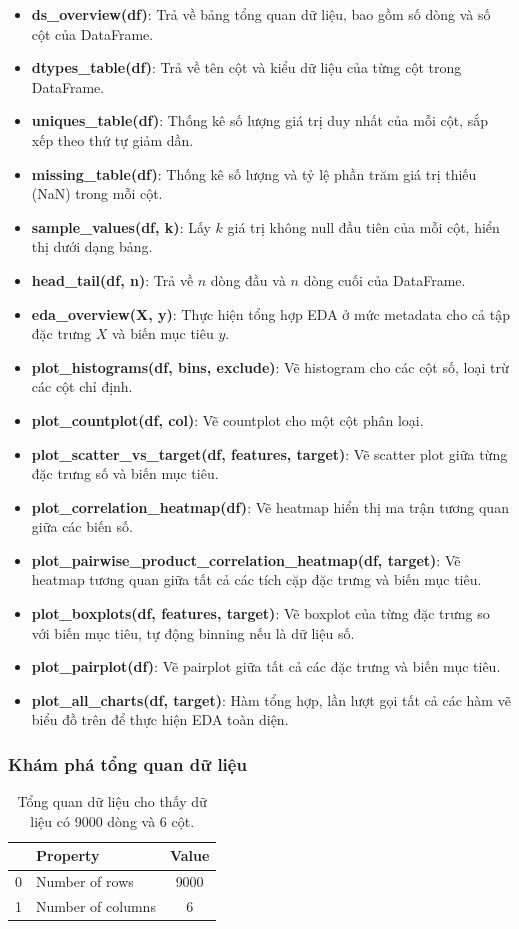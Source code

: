 \begin{itemize}
	\item \textbf{ds\_overview(df)}: Trả về bảng tổng quan dữ liệu, bao gồm số dòng và số cột của DataFrame.
	\item \textbf{dtypes\_table(df)}: Trả về tên cột và kiểu dữ liệu của từng cột trong DataFrame.
	\item \textbf{uniques\_table(df)}: Thống kê số lượng giá trị duy nhất của mỗi cột, sắp xếp theo thứ tự giảm dần.
	\item \textbf{missing\_table(df)}: Thống kê số lượng và tỷ lệ phần trăm giá trị thiếu (NaN) trong mỗi cột.
	\item \textbf{sample\_values(df, k)}: Lấy $k$ giá trị không null đầu tiên của mỗi cột, hiển thị dưới dạng bảng.
	\item \textbf{head\_tail(df, n)}: Trả về $n$ dòng đầu và $n$ dòng cuối của DataFrame.
	\item \textbf{eda\_overview(X, y)}: Thực hiện tổng hợp EDA ở mức metadata cho cả tập đặc trưng $X$ và biến mục tiêu $y$.
	\item \textbf{plot\_histograms(df, bins, exclude)}: Vẽ histogram cho các cột số, loại trừ các cột chỉ định.
	\item \textbf{plot\_countplot(df, col)}: Vẽ countplot cho một cột phân loại.
	\item \textbf{plot\_scatter\_vs\_target(df, features, target)}: Vẽ scatter plot giữa từng đặc trưng số và biến mục tiêu.
	\item \textbf{plot\_correlation\_heatmap(df)}: Vẽ heatmap hiển thị ma trận tương quan giữa các biến số.
	\item \textbf{plot\_pairwise\_product\_correlation\_heatmap(df, target)}: Vẽ heatmap tương quan giữa tất cả các tích cặp đặc trưng và biến mục tiêu.
	\item \textbf{plot\_boxplots(df, features, target)}: Vẽ boxplot của từng đặc trưng so với biến mục tiêu, tự động binning nếu là dữ liệu số.
	\item \textbf{plot\_pairplot(df)}: Vẽ pairplot giữa tất cả các đặc trưng và biến mục tiêu.
	\item \textbf{plot\_all\_charts(df, target)}: Hàm tổng hợp, lần lượt gọi tất cả các hàm vẽ biểu đồ trên để thực hiện EDA toàn diện.
\end{itemize}

\subsubsection{Khám phá tổng quan dữ liệu}
\begin{table}[H]
	\centering
	\begin{tabular}{|c|l|c|}
		\hline
		\textbf{} & \textbf{Property} & \textbf{Value} \\ \hline
		0         & Number of rows    & 9000           \\
		1         & Number of columns & 6              \\ \hline
	\end{tabular}
	\caption{Tổng quan dữ liệu cho thấy dữ liệu có 9000 dòng và 6 cột.}
\end{table}

